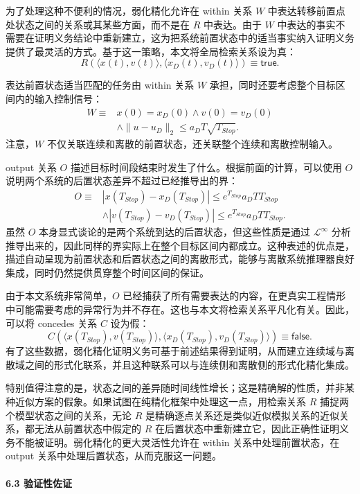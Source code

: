 {\indent 为了处理这种不便利的情况，弱化精化允许在 within 关系 $W$ 中表达转移前置点处状态之间的关系或其某些方面，而不是在 $R$ 中表达。由于 $W$ 中表达的事实不需要在证明义务结论中重新建立，这为把系统前置状态中的适当事实纳入证明义务提供了最灵活的方式。基于这一策略，本文将全局检索关系设为真：
\[
R(\langle x(t),v(t)\rangle,\langle x_D(t),v_D(t)\rangle)\equiv \textsf{true}.
\]

\indent 表达前置状态适当匹配的任务由 within 关系 $W$ 承担，同时还要考虑整个目标区间内的输入控制信号：
\[
\begin{aligned}
W\equiv{}&x(0)=x_D(0)\land v(0)=v_D(0)\\
&\land \|u-u_D\|_2\leq a_DT\sqrt{T_{Stop}} .
\end{aligned}
\]
注意，$W$ 不仅关联连续和离散的前置状态，还关联整个连续和离散控制输入。

\indent output 关系 $O$ 描述目标时间段结束时发生了什么。根据前面的计算，可以使用 $O$ 说明两个系统的后置状态差异不超过已经推导出的界：
\[
\begin{aligned}
O\equiv{}&|x(T_{Stop})-x_D(T_{Stop})|
\leq e^{T_{Stop}}a_DTT_{Stop}\\
&\land |v(T_{Stop})-v_D(T_{Stop})|
\leq e^{T_{Stop}}a_DTT_{Stop}.
\end{aligned}
\]
虽然 $O$ 本身显式谈论的是两个系统到达的后置状态，但这些性质是通过 $\mathcal{L}^{\infty}$ 分析推导出来的，因此同样的界实际上在整个目标区间内都成立。这种表述的优点是，描述自动呈现为前置状态和后置状态之间的离散形式，能够与离散系统推理器良好集成，同时仍然提供贯穿整个时间区间的保证。

\indent 由于本文系统非常简单，$O$ 已经捕获了所有需要表达的内容，在更真实工程情形中可能需要考虑的异常行为并不存在。这也与本文将检索关系平凡化有关。因此，可以将 concedes 关系 $C$ 设为假：
\[
C(\langle x(T_{Stop}),v(T_{Stop})\rangle,
\langle x_D(T_{Stop}),v_D(T_{Stop})\rangle)\equiv \textsf{false}.
\]
有了这些数据，弱化精化证明义务可基于前述结果得到证明，从而建立连续域与离散域之间的形式化联系，并且这种联系可以与连续侧和离散侧的形式化精化集成。

\indent 特别值得注意的是，状态之间的差异随时间线性增长；这是精确解的性质，并非某种近似方案的假象。如果试图在纯精化框架中处理这一点，用检索关系 $R$ 捕捉两个模型状态之间的关系，无论 $R$ 是精确逐点关系还是类似近似模拟关系的近似关系，都无法从前置状态中假定的 $R$ 在后置状态中重新建立它，因此正确性证明义务不能被证明。弱化精化的更大灵活性允许在 within 关系中处理前置状态，在 output 关系中处理后置状态，从而克服这一问题。

\paragraph{6.3 验证性佐证}

}
